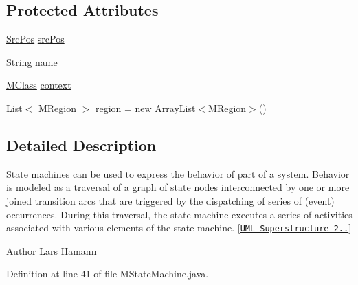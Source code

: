 \subsection*{Protected Attributes}
\begin{DoxyCompactItemize}
\item 
\hyperlink{classorg_1_1tzi_1_1use_1_1parser_1_1_src_pos}{Src\-Pos} \hyperlink{classorg_1_1tzi_1_1use_1_1uml_1_1mm_1_1statemachines_1_1_m_state_machine_a4892c5ab13ec73b51355c89b1eeb0cf1}{src\-Pos}
\item 
String \hyperlink{classorg_1_1tzi_1_1use_1_1uml_1_1mm_1_1statemachines_1_1_m_state_machine_a538bcb13ae44862dd544ce80edc5fee5}{name}
\item 
\hyperlink{interfaceorg_1_1tzi_1_1use_1_1uml_1_1mm_1_1_m_class}{M\-Class} \hyperlink{classorg_1_1tzi_1_1use_1_1uml_1_1mm_1_1statemachines_1_1_m_state_machine_abbb45f526adbcec12caa20ac6acb770b}{context}
\item 
List$<$ \hyperlink{classorg_1_1tzi_1_1use_1_1uml_1_1mm_1_1statemachines_1_1_m_region}{M\-Region} $>$ \hyperlink{classorg_1_1tzi_1_1use_1_1uml_1_1mm_1_1statemachines_1_1_m_state_machine_a91928269ee5b72b57106b54b51c90a36}{region} = new Array\-List$<$\hyperlink{classorg_1_1tzi_1_1use_1_1uml_1_1mm_1_1statemachines_1_1_m_region}{M\-Region}$>$()
\end{DoxyCompactItemize}


\subsection{Detailed Description}
State machines can be used to express the behavior of part of a system. Behavior is modeled as a traversal of a graph of state nodes interconnected by one or more joined transition arcs that are triggered by the dispatching of series of (event) occurrences. During this traversal, the state machine executes a series of activities associated with various elements of the state machine. \mbox{[}\href{http://www.omg.org/spec/UML/}{\tt U\-M\-L Superstructure 2..}\mbox{]}

\begin{DoxyAuthor}{Author}
Lars Hamann 
\end{DoxyAuthor}


Definition at line 41 of file M\-State\-Machine.\-java.



